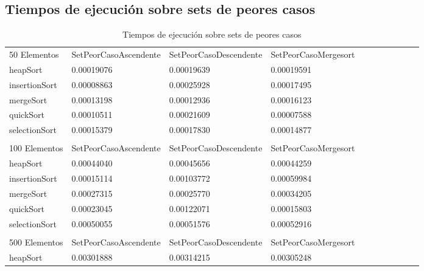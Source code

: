 \documentclass[article,a4paper]{article}
\begin{document}
\subsection{Tiempos de ejecución sobre sets de peores casos}

\begin{table}[h]
\centering
\caption{Tiempos de ejecución sobre sets de peores casos}
\begin{adjustbox}{width=\textwidth,totalheight=\textheight,keepaspectratio}
\tiny
\begin{tabular}{lllllllllll}
50 Elementos    & SetPeorCasoAscendente & SetPeorCasoDescendente & SetPeorCasoMergesort \\
heapSort        & 0.00019076            & 0.00019639             & 0.00019591           \\
insertionSort   & 0.00008863            & 0.00025928             & 0.00017495           \\
mergeSort       & 0.00013198            & 0.00012936             & 0.00016123           \\
quickSort       & 0.00010511            & 0.00021609             & 0.00007588           \\
selectionSort   & 0.00015379            & 0.00017830             & 0.00014877           \\
                &                       &                        &                      \\
100 Elementos   & SetPeorCasoAscendente & SetPeorCasoDescendente & SetPeorCasoMergesort \\
heapSort        & 0.00044040            & 0.00045656             & 0.00044259           \\
insertionSort   & 0.00015114            & 0.00103772             & 0.00059984           \\
mergeSort       & 0.00027315            & 0.00025770             & 0.00034205           \\
quickSort       & 0.00023045            & 0.00122071             & 0.00015803           \\
selectionSort   & 0.00050055            & 0.00051576             & 0.00052916           \\
                &                       &                        &                      \\
500 Elementos   & SetPeorCasoAscendente & SetPeorCasoDescendente & SetPeorCasoMergesort \\
heapSort        & 0.00301888            & 0.00314215             & 0.00305248           \\

\end{tabular}
\end{adjustbox}
\end{table}
\end{document}
